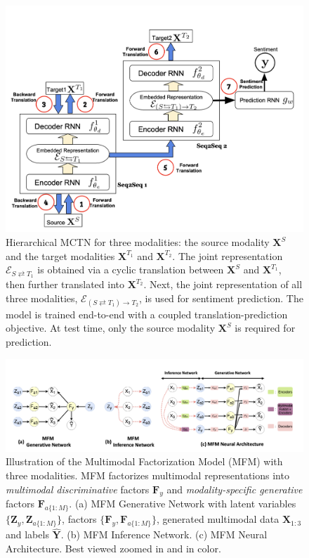 \documentclass{article}
\begin{document}
\begin{figure}[h]
    \centering
    \includegraphics[width=1\linewidth]{figs/MCTN.png}
    \caption{Hierarchical MCTN for three modalities: the source modality $\mathbf{X}^S$ and the target modalities $\mathbf{X}^{T_1}$ and $\mathbf{X}^{T_2}$. The joint representation $\mathcal{E}_{S \rightleftarrows T_1}$ is obtained via a cyclic translation between $\mathbf{X}^S$ and $\mathbf{X}^{T_1}$, then further translated into $\mathbf{X}^{T_2}$. Next, the joint representation of all three modalities, $\mathcal{E}_{(S \rightleftarrows T_1) \rightarrow T_2}$, is used for sentiment prediction. The model is trained end-to-end with a coupled translation-prediction objective. At test time, only the source modality $\mathbf{X}^S$ is required for prediction.}
    \label{fig:MCTN}
\end{figure}

\begin{figure}[h]
    \includegraphics[width=1\linewidth]{figs/Factorized.png}
\caption{Illustration of the Multimodal Factorization Model (MFM) with three modalities. MFM factorizes multimodal representations into \textit{multimodal discriminative} factors $\mathbf{F}_y$ and \textit{modality-specific generative} factors $\mathbf{F}_{a\{1:M\}}$. (a) MFM Generative Network with latent variables $\{\mathbf{Z}_y, \mathbf{Z}_{a\{1:M\}}\}$, factors $\{\mathbf{F}_y, \mathbf{F}_{a\{1:M\}}\}$, generated multimodal data $\hat{\mathbf{X}}_{1:3}$ and labels $\hat{\mathbf{Y}}$. (b) MFM Inference Network. (c) MFM Neural Architecture. Best viewed zoomed in and in color. \cite{FactorizedMult}}
    \label{fig:factorized}
\end{figure}
\end{document}
